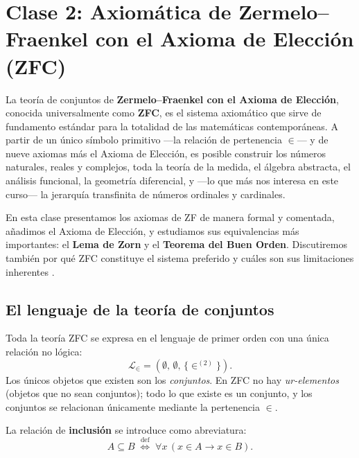 \chapter{Clase 2: Axiomática de Zermelo–Fraenkel con el Axioma de Elección (ZFC)}

La teoría de conjuntos de \textbf{Zermelo–Fraenkel con el Axioma de Elección}, conocida universalmente como \textbf{ZFC}, es el sistema axiomático que sirve de fundamento estándar para la totalidad de las matemáticas contemporáneas. A partir de un único símbolo primitivo —la relación de pertenencia $\in$— y de nueve axiomas más el Axioma de Elección, es posible construir los números naturales, reales y complejos, toda la teoría de la medida, el álgebra abstracta, el análisis funcional, la geometría diferencial, y —lo que más nos interesa en este curso— la jerarquía transfinita de números ordinales y cardinales.

En esta clase presentamos los axiomas de ZF de manera formal y comentada, añadimos el Axioma de Elección, y estudiamos sus equivalencias más importantes: el \textbf{Lema de Zorn} y el \textbf{Teorema del Buen Orden}. Discutiremos también por qué ZFC constituye el sistema preferido y cuáles son sus limitaciones inherentes \cite{kunen2011, jech2003, halmos1960}.

\section{El lenguaje de la teoría de conjuntos}

Toda la teoría ZFC se expresa en el lenguaje de primer orden con una única relación no lógica:
\[
  \mathcal{L}_{\in} = (\emptyset,\, \emptyset,\, \{\in^{(2)}\}).
\]
Los únicos objetos que existen son los \emph{conjuntos}. En ZFC no hay \emph{ur-elementos} (objetos que no sean conjuntos); todo lo que existe es un conjunto, y los conjuntos se relacionan únicamente mediante la pertenencia $\in$.

La relación de \textbf{inclusión} se introduce como abreviatura:
\[
  A \subseteq B \;\stackrel{\mathrm{def}}{\iff}\; \forall x\,(x \in A \to x \in B).
\]

